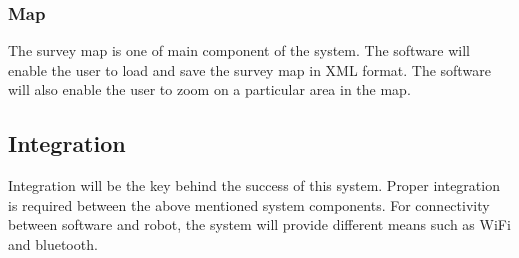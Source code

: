 \subsubsection{Map}
The survey map is one of main component of the system. The software will enable the user to load and save the survey map in XML format. The software will also enable the user to zoom on a particular area in the map. 
\subsection{Integration}
Integration will be the key behind the success of this system. Proper integration is required between the above mentioned system components. For connectivity between software and robot, the system will provide different means such as WiFi and bluetooth.  
